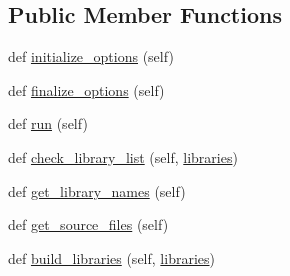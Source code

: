 \subsection*{Public Member Functions}
\begin{DoxyCompactItemize}
\item 
def \hyperlink{classsetuptools_1_1__distutils_1_1command_1_1build__clib_1_1build__clib_ad329876375a54dfdc8c5ac9a7c135015}{initialize\+\_\+options} (self)
\item 
def \hyperlink{classsetuptools_1_1__distutils_1_1command_1_1build__clib_1_1build__clib_a1a9dc9bf4f47f02eed601ccae7d14c1d}{finalize\+\_\+options} (self)
\item 
def \hyperlink{classsetuptools_1_1__distutils_1_1command_1_1build__clib_1_1build__clib_afce9f4cef877e2ca542ff6d15286432b}{run} (self)
\item 
def \hyperlink{classsetuptools_1_1__distutils_1_1command_1_1build__clib_1_1build__clib_a3041c6d7996254404026ac45b0abce8f}{check\+\_\+library\+\_\+list} (self, \hyperlink{classsetuptools_1_1__distutils_1_1command_1_1build__clib_1_1build__clib_a1f44c483b10326b261561c35e5f5603b}{libraries})
\item 
def \hyperlink{classsetuptools_1_1__distutils_1_1command_1_1build__clib_1_1build__clib_a018f5523ad2a18b260ca2149d1a93808}{get\+\_\+library\+\_\+names} (self)
\item 
def \hyperlink{classsetuptools_1_1__distutils_1_1command_1_1build__clib_1_1build__clib_afe0a6a4f2f70425a57a33a01fb13477d}{get\+\_\+source\+\_\+files} (self)
\item 
def \hyperlink{classsetuptools_1_1__distutils_1_1command_1_1build__clib_1_1build__clib_a75b8609b7dcf302e0901c7b3e9afd2cf}{build\+\_\+libraries} (self, \hyperlink{classsetuptools_1_1__distutils_1_1command_1_1build__clib_1_1build__clib_a1f44c483b10326b261561c35e5f5603b}{libraries})
\end{DoxyCompactItemize}
